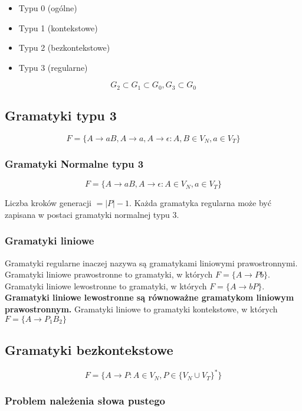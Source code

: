 \documentclass{../notatki}
\begin{document}
\begin{itemize}
  \item Typu 0 (ogólne)
  \item Typu 1 (kontekstowe)
  \item Typu 2 (bezkontekstowe)
  \item Typu 3 (regularne)
\end{itemize}

$$
G_2 \subset G_1 \subset G_0, G_3 \subset G_0
$$

\subsection{Gramatyki typu 3}

$$
F = \{A \rightarrow aB, A \rightarrow a, A \rightarrow \epsilon : A,
B \in V_N, a \in V_T\}
$$

\subsubsection{Gramatyki Normalne typu 3}

$$
F = \{A \rightarrow aB, A \rightarrow \epsilon : A \in V_N, a \in V_T\}
$$

Liczba kroków generacji $= |P| - 1$.
Każda gramatyka regularna może być zapisana w postaci gramatyki
normalnej typu 3.

\subsubsection{Gramatyki liniowe}

Gramatyki regularne inaczej nazywa są gramatykami liniowymi prawostronnymi.
Gramatyki liniowe prawostronne to gramatyki, w których $F = \{A
\rightarrow Pb\}$.
Gramatyki liniowe lewostronne to gramatyki, w których $F = \{A
\rightarrow bP\}$.
\textbf{Gramatyki liniowe lewostronne są równoważne gramatykom
liniowym prawostronnym.}
Gramatyki liniowe to gramatyki kontekstowe, w których $F = \{A
\rightarrow P_1B_2\}$

\subsection{Gramatyki bezkontekstowe}

$$
F = \{A \rightarrow P : A \in V_N, P \in \{V_N \cup V_T\}^*\}
$$

\subsubsection{Problem należenia słowa pustego}
\end{document}
